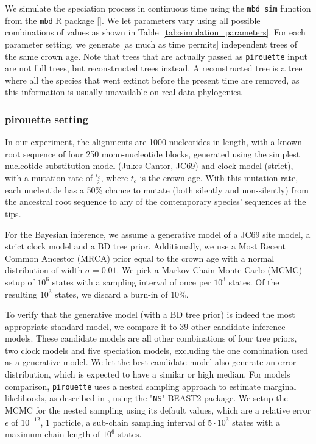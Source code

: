 We simulate the speciation process in continuous time using the \verb;mbd_sim; function from the \verb;mbd; R package [\citep{mbd}].
We let parameters vary using all possible combinations of values as shown in Table~\ref{tab:simulation_parameters}.
For each parameter setting, we generate [as much as time permits] 
independent trees of the same crown age. Note that trees that are actually passed as \verb;pirouette; input are not full trees, but reconstructed trees instead. A reconstructed tree is a tree where all the species that went extinct before the present time are removed, as this information is usually unavailable on real data phylogenies.



\subsubsection{pirouette setting}

In our experiment, the alignments are 1000 nucleotides in length, with a known root sequence of four 250 mono-nucleotide blocks, generated using the simplest nucleotide substitution model (Jukes Cantor, JC69) and clock model (strict), with a mutation rate of $\frac{t_c}{2}$, where $t_c$ is the crown age. 
With this mutation rate, each nucleotide has a 50\% chance to mutate (both silently and non-silently) from the ancestral root sequence to any of the contemporary species' sequences at the tips.

For the Bayesian inference, we assume a generative model of a JC69 site model, a strict clock model and a BD tree prior.
Additionally, we use a Most Recent Common Ancestor (MRCA) prior equal to the crown age with a normal distribution of width $\sigma = 0.01$. We pick a Markov Chain Monte Carlo (MCMC) setup of $10^6$ states with a sampling interval of once per $10^3$ states. Of the resulting $10^3$ states, we discard a burn-in of $10\%$.

To verify that the generative model (with a BD tree prior) is indeed the most appropriate standard model, we compare it to 39 other candidate inference models.
These candidate models are all other combinations of four tree priors, two clock models and five speciation models, excluding the one combination used as a generative model.
We let the best candidate model also generate an error distribution, which is expected to have a similar or high median.
For models comparison, \verb;pirouette; uses a nested sampling approach to estimate marginal likelihoods, as described in \citet{russel2019model}, using the "\verb;NS;" BEAST2 package. We setup the MCMC for the nested sampling using its default values, which are a relative error $\epsilon$ of $10^{-12}$, 
1 particle, a sub-chain sampling interval of $5 \cdot 10^3$ states with a maximum chain length of $10^6$ states.

